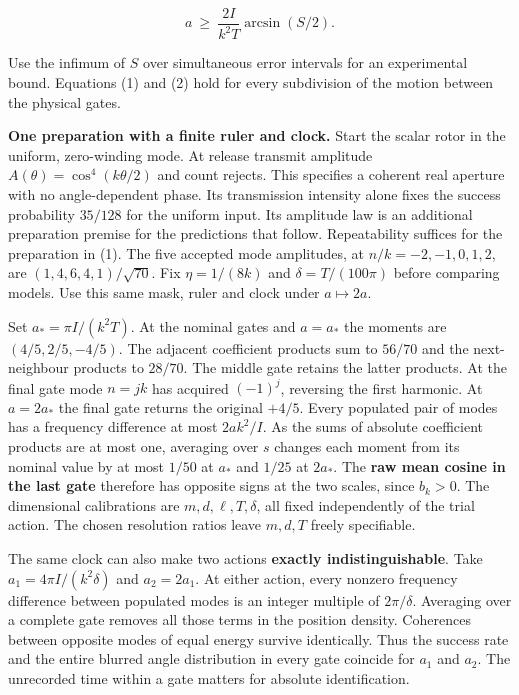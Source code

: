 \documentclass[11pt,a4paper]{article}
\begin{document}
\[
                 a\ \ge\ \frac{2I}{k^2T}\arcsin(S/2).              \tag{2}
\]

Use the infimum of \(S\) over simultaneous error intervals for an
experimental bound. Equations (1) and (2) hold for every subdivision of
the motion between the physical gates.

\textbf{One preparation with a finite ruler and clock.} Start the scalar
rotor in the uniform, zero-winding mode. At release transmit amplitude
\(A(\theta)=\cos^4(k\theta/2)\) and count rejects. This specifies a
coherent real aperture with no angle-dependent phase. Its transmission
intensity alone fixes the success probability \(35/128\) for the uniform
input. Its amplitude law is an additional preparation premise for the
predictions that follow. Repeatability suffices for the preparation in
(1). The five accepted mode amplitudes, at \(n/k=-2,-1,0,1,2\), are
\((1,4,6,4,1)/\sqrt{70}\). Fix \(\eta=1/(8k)\) and \(\delta=T/(100\pi)\)
before comparing models. Use this same mask, ruler and clock under
\(a\mapsto 2a\).

Set \(a_*=\pi I/(k^2T)\). At the nominal gates and \(a=a_*\) the moments
are \((4/5,2/5,-4/5)\). The adjacent coefficient products sum to
\(56/70\) and the next-neighbour products to \(28/70\). The middle gate
retains the latter products. At the final gate mode \(n=jk\) has
acquired \((-1)^j\), reversing the first harmonic. At \(a=2a_*\) the
final gate returns the original \(+4/5\). Every populated pair of modes
has a frequency difference at most \(2ak^2/I\). As the sums of absolute
coefficient products are at most one, averaging over \(s\) changes each
moment from its nominal value by at most \(1/50\) at \(a_*\) and
\(1/25\) at \(2a_*\). The \textbf{raw mean cosine in the last gate}
therefore has opposite signs at the two scales, since \(b_k>0\). The
dimensional calibrations are \(m,d,\ell,T,\delta\), all fixed
independently of the trial action. The chosen resolution ratios leave
\(m,d,T\) freely specifiable.

The same clock can also make two actions \textbf{exactly
indistinguishable}. Take \(a_1=4\pi I/(k^2\delta)\) and \(a_2=2a_1\). At
either action, every nonzero frequency difference between populated
modes is an integer multiple of \(2\pi/\delta\). Averaging over a
complete gate removes all those terms in the position density.
Coherences between opposite modes of equal energy survive identically.
Thus the success rate and the entire blurred angle distribution in every
gate coincide for \(a_1\) and \(a_2\). The unrecorded time within a gate
matters for absolute identification.
\end{document}
